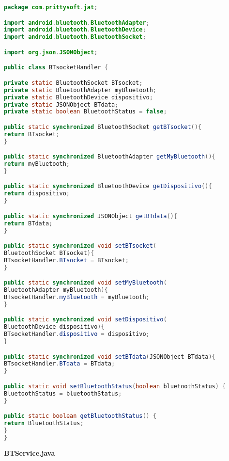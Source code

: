 \begin{lstlisting}[language=java, caption={Clase BTSocketHandler, para mantener los mismos datos bluetooth en toda la aplicación}, captionpos=b, basicstyle=\small]
package com.prittysoft.jat;

import android.bluetooth.BluetoothAdapter;
import android.bluetooth.BluetoothDevice;
import android.bluetooth.BluetoothSocket;

import org.json.JSONObject;

public class BTsocketHandler {

private static BluetoothSocket BTsocket;
private static BluetoothAdapter myBluetooth;
private static BluetoothDevice dispositivo;
private static JSONObject BTdata;
private static boolean BluetoothStatus = false;

public static synchronized BluetoothSocket getBTsocket(){
return BTsocket;
}

public static synchronized BluetoothAdapter getMyBluetooth(){
return myBluetooth;
}

public static synchronized BluetoothDevice getDispositivo(){
return dispositivo;
}

public static synchronized JSONObject getBTdata(){
return BTdata;
}

public static synchronized void setBTsocket(
BluetoothSocket BTsocket){
BTsocketHandler.BTsocket = BTsocket;
}

public static synchronized void setMyBluetooth(
BluetoothAdapter myBluetooth){
BTsocketHandler.myBluetooth = myBluetooth;
}

public static synchronized void setDispositivo(
BluetoothDevice dispositivo){
BTsocketHandler.dispositivo = dispositivo;
}

public static synchronized void setBTdata(JSONObject BTdata){
BTsocketHandler.BTdata = BTdata;
}

public static void setBluetoothStatus(boolean bluetoothStatus) {
BluetoothStatus = bluetoothStatus;
}

public static boolean getBluetoothStatus() {
return BluetoothStatus;
}
}
\end{lstlisting}

\clearpage
\centering\textbf{BTService.java}

